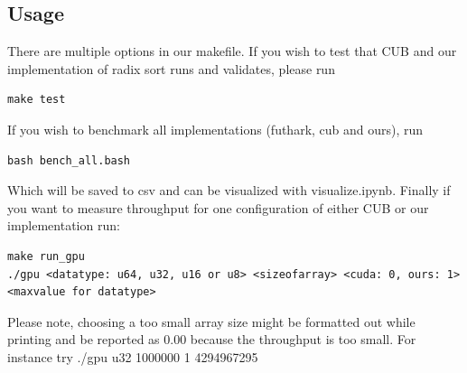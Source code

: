 \documentclass{article}
\begin{document}
\subsection{Usage}

There are multiple options in our makefile. If you wish to test that CUB and our implementation of radix sort runs and validates, please run
\begin{lstlisting}
make test
\end{lstlisting}
If you wish to benchmark all implementations (futhark, cub and ours), run 
\begin{lstlisting}
bash bench_all.bash
\end{lstlisting}
Which will be saved to csv and can be visualized with visualize.ipynb.
Finally if you want to measure throughput for one configuration of either CUB or our implementation run:
\begin{lstlisting}
make run_gpu
./gpu <datatype: u64, u32, u16 or u8> <sizeofarray> <cuda: 0, ours: 1> <maxvalue for datatype>
\end{lstlisting}
Please note, choosing a too small array size might be formatted out while printing and be reported as 0.00 because the throughput is too small. For instance try ./gpu u32 1000000 1 4294967295





\end{document}
